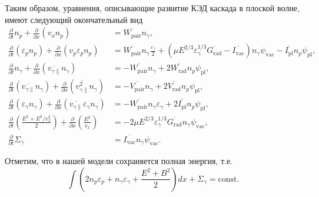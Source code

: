 Таким образом, уравнения, описывающие развитие КЭД каскада в плоской волне, имеют следующий окончательный вид
\begin{align}
    \label{eq:ch2/fin1}
    \frac{\partial }{\partial t}n_p  +\frac{\partial}{\partial x}\left( v_x n_p \right) &= \overline{W_\mathrm{pair}} n_\gamma  ,\\
    \label{eq:ch2/fin2}
    \frac{\partial}{\partial t}\left( \varepsilon_p n_p \right)  + \frac{\partial}{\partial x}\left( v_p \varepsilon_p n_p \right)  &= \overline{W_\mathrm{pair}} n_\gamma \frac{\varepsilon_\gamma}{2}  +\left( \mu E^{2/3}\varepsilon_\gamma^{1/3}\overline{G_\mathrm{rad}} - \overline{I_\mathrm{vac}} \right)n_\gamma \psi_\mathrm{vac} - \overline{I_\mathrm{pl}} n_p \psi_\mathrm{pl} ,\\
    \label{eq:ch2/fin3}
    \frac{\partial }{\partial t}n_\gamma  +\frac{\partial}{\partial x}\left( \overline{v_{\gamma\parallel}} n_\gamma \right)&=-\overline{W_\mathrm{pair}} n_\gamma + 2\overline{W_\mathrm{rad}} n_p \psi_\mathrm{pl} ,\\
    \label{eq:ch2/fin4}
    \frac{\partial}{\partial t}\left( \overline{v_{\gamma\parallel}} n_\gamma \right) + \frac{\partial}{\partial x}\left( \overline{v_{\gamma\parallel}^2} n_\gamma \right) &= -\overline{V_\mathrm{pair}} n_\gamma + 2 \overline{V_\mathrm{rad}} n_p \psi_\mathrm{pl} ,\\
    \label{eq:ch2/fin5}
    \frac{\partial}{\partial t}\left( \varepsilon_\gamma n_\gamma \right) +\frac{\partial}{\partial x}\left( \overline{v_{\gamma\parallel}} \varepsilon_\gamma n_\gamma \right) &=-\overline{W_\mathrm{pair}}n_\gamma\varepsilon_\gamma   +2 \overline{I_\mathrm{pl}} n_p \psi_\mathrm{pl} ,\\
    \label{eq:ch2/fin6}
    \frac{\partial }{\partial t}\left( \frac{E^2 + E^2/v_x^2}{2} \right) +\frac{\partial}{\partial x} \left( \frac{E^2}{v_x} \right) &=  -2\mu E^{2/3}\varepsilon_\gamma^{1/3}\overline{G_\mathrm{rad}} n_\gamma\psi_\mathrm{vac}  ,\\
    \label{eq:ch2/fin7}
    \frac{\partial }{\partial t}\Sigma_\gamma &=  \overline{I_\mathrm{vac}} n_\gamma \psi_\mathrm{vac} .
\end{align}

Отметим, что в нашей модели сохраняется полная энергия, т.е.
\begin{equation}
    \int \left( 2n_p\varepsilon_p + n_\gamma \varepsilon_\gamma + \frac{E^2 + B^2}{2} \right) dx + \Sigma_\gamma = \text{const} .
\end{equation}


